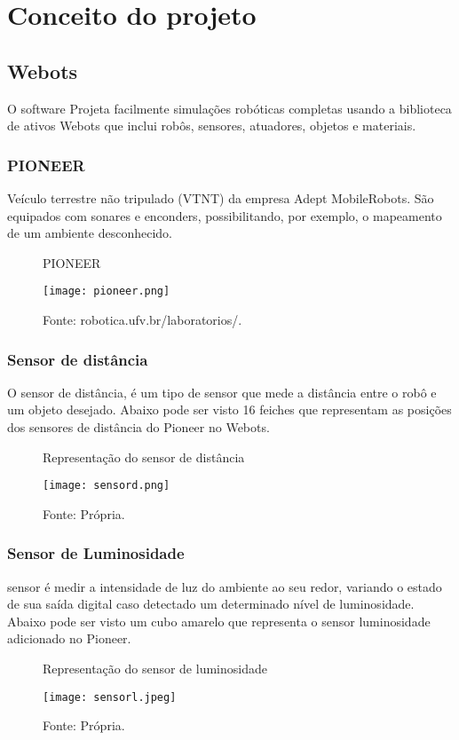 \chapter{Conceito do projeto}
\label{chap:fundteor}
\section{Webots}
O software Projeta facilmente simulações robóticas completas usando a biblioteca de ativos Webots que inclui
robôs, sensores, atuadores, objetos e materiais.
\subsection{PIONEER}
Veículo terrestre não tripulado (VTNT) da empresa Adept MobileRobots.
São equipados com sonares e enconders, possibilitando, por exemplo, o mapeamento de um ambiente desconhecido.
\begin{figure} [h!]	
   \centering
   \caption{PIONEER}
   \texttt{[image: pioneer.png]}
   \caption*{Fonte: robotica.ufv.br/laboratorios/.}
   \label{fig:pioneer}
\end{figure}	


\subsection{Sensor de distância} 
O sensor de distância, é um tipo de sensor que mede a distância entre o robô e um objeto desejado.
Abaixo pode ser visto 16 feiches que representam as posições dos sensores de distância do Pioneer no Webots.

\begin{figure} [h!]	
   \centering
   \caption{Representação do sensor de distância}
   \texttt{[image: sensord.png]}
   \caption*{Fonte: Própria.}
   \label{fig:sensordistancia}

\end{figure}	

\subsection{Sensor de Luminosidade} 
sensor é medir a intensidade de luz do ambiente ao seu redor, variando o estado de sua saída digital caso detectado um determinado nível de luminosidade. 
Abaixo pode ser visto um cubo amarelo que representa o sensor luminosidade adicionado no Pioneer.

\begin{figure} [h!]	
   \centering
   \caption{Representação do sensor de luminosidade}
   \texttt{[image: sensorl.jpeg]}
   \caption*{Fonte: Própria.}
   \label{fig:sensorluminosidade}
\end{figure}	


